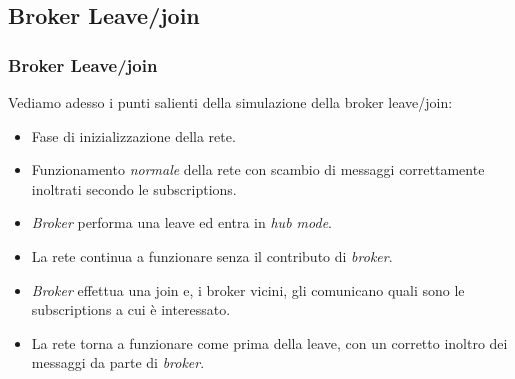 \documentclass{beamer}
\begin{document}
\begin{frame}

	

\end{frame}

\subsection{Broker Leave/join}

\begin{frame}
	\frametitle{Broker Leave/join}
	
	Vediamo adesso i punti salienti della simulazione della broker leave/join:
	\begin{itemize}
		\item Fase di inizializzazione della rete.
		\item Funzionamento \emph{normale} della rete con scambio di messaggi correttamente inoltrati secondo le subscriptions.
		\item \emph{Broker} performa una leave ed entra in \emph{hub mode}.
		\item La rete continua a funzionare senza il contributo di \emph{broker}.
		\item \emph{Broker} effettua una join e, i broker vicini, gli comunicano quali sono le subscriptions a cui è interessato.
		\item La rete torna a funzionare come prima della leave, con un corretto inoltro dei messaggi da parte di \emph{broker}.
	\end{itemize}
\end{frame}

\begin{frame}
	
	
\end{frame}
\end{document}
